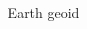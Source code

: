 \documentclass[aspectratio=169]{beamer}
\begin{document}
{
\begin{frame}[plain]
\begin{columns}[onlytextwidth]
        \begin{column}{.7\textwidth}
        \end{column}
	\begin{column}{0.3\textwidth}
		\begin{shaded}
			Earth geoid
		\end{shaded}
	\end{column}
    \end{columns}
\end{frame}}


{
\begin{frame}[plain]
\end{frame}}
\end{document}
